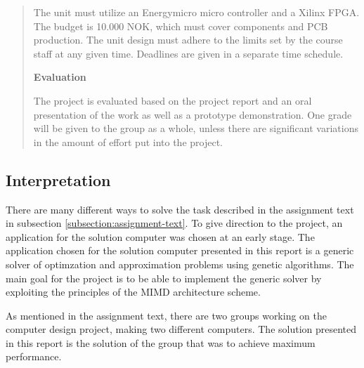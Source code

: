 \begin{quote}
The unit must utilize an Energymicro micro controller and a Xilinx FPGA.
The budget is 10.000 NOK, which must cover components and PCB production.
The unit design must adhere to the limits set by the course staff at any given time.
Deadlines are given in a separate time schedule.

\textbf{Evaluation}

The project is evaluated based on the project report and an oral presentation of the work as well as a prototype demonstration.
One grade will be given to the group as a whole, unless there are significant variations in the amount of effort put into the project. 

\end{quote}

\subsection{Interpretation}

There are many different ways to solve the task described in the assignment text in subsection \vref{subsection:assignment-text}.
To give direction to the project, an application for the solution computer was chosen at an early stage.
The application chosen for the solution computer presented in this report is a generic solver of optimzation and approximation problems using genetic algorithms.
The main goal for the project is to be able to implement the generic solver by exploiting the principles of the MIMD architecture scheme.

As mentioned in the assignment text\cn, there are two groups working on the computer design project, making two different computers.
The solution presented in this report is the solution of the group that was to achieve maximum performance.
